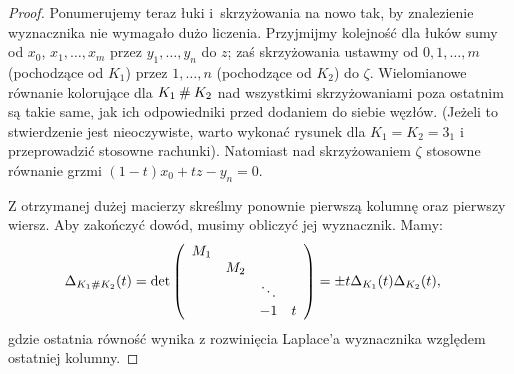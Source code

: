 \begin{proof}
\begin{comment}
            \strand[thick] (30, 10) [in=right, out=left] to (25, 10) to (10, -10);
            \strand[thick,latex-] (30, -10) [in=right, out=left] to (25, -10) to (10, 10);

            \node[darkblue] at (-50,10) [below] {$x_1,\ldots,x_{m-1}$};
            \node[red] at (-50,-10) [above] {$1,\ldots,m$};

            \node[darkblue] at (50,10) [below] {$y_1,\ldots,y_{n-1}$};
            \node[red] at (50,-10) [above] {$1,\ldots,n$};

            \node[darkblue] at (-20,-10)[below] {$x_m$};
            \node[darkblue] at (0, 10)[above] {$z$};
            \node[darkblue] at (25,-10)[below] {$y_n$};
            \node[darkblue] at (0, -10)[below] {$x_0 = y_0$};
            \node[red] at ( 20,  0)[right]{$\zeta$};
            \node[red] at (-20,  0)[left]{$0$};
        \end{knot}
    \end{tikzpicture}\]
\end{comment}

    Ponumerujemy teraz łuki i~skrzyżowania na nowo tak, by znalezienie wyznacznika nie wymagało dużo liczenia.
    Przyjmijmy kolejność dla łuków sumy od $x_0$, $x_1, \ldots, x_m$ przez $y_1, \ldots, y_n$ do $z$; zaś skrzyżowania ustawmy od $0, 1, \ldots, m$ (pochodzące od $K_1$) przez $1, \ldots, n$ (pochodzące od $K_2$) do $\zeta$.
    Wielomianowe równanie kolorujące dla $K_1 \mathbin{\#} K_2$ nad wszystkimi skrzyżowaniami poza ostatnim są takie same, jak ich odpowiedniki przed dodaniem do siebie węzłów.
    (Jeżeli to stwierdzenie jest nieoczywiste, warto wykonać rysunek dla $K_1 = K_2 = 3_1$ i przeprowadzić stosowne rachunki).
    Natomiast nad skrzyżowaniem $\zeta$ stosowne równanie grzmi $(1-t)x_0 + tz - y_n = 0$.

    Z otrzymanej dużej macierzy skreślmy ponownie pierwszą kolumnę oraz pierwszy wiersz.
    Aby zakończyć dowód, musimy obliczyć jej wyznacznik.
    Mamy:
    \begin{align*}
        \Delta_{K_1 \mathbin{\#} K_2}(t) & = \det \left(\begin{array}{cccc}
            M_1 &     &        & \\
                & M_2 &        & \\
                &     & \ddots & \\
                &     & -1     & t
    \end{array}\right) = \pm t \Delta_{K_1}(t) \Delta_{K_2}(t),
    \end{align*}
    gdzie ostatnia równość wynika z rozwinięcia Laplace'a wyznacznika względem ostatniej kolumny.
\end{proof}


